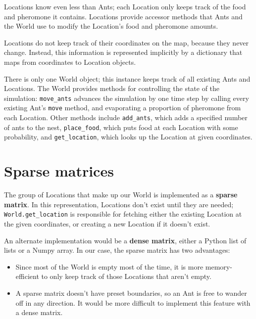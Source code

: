 \documentclass[10pt]{book}
\begin{document}
Locations know even less than Ants; each Location only keeps track of
the food and pheromone it contains. Locations provide
accessor methods that Ants and the World
use to modify the Location's food and pheromone amounts.

Locations do not keep track of their
coordinates on the map, because they never change.  Instead, this information
is represented implicitly by a dictionary that maps from coordinates
to Location objects.

There is only one World object; this instance keeps track of all
existing Ants and Locations.  The World provides methods for controlling
the state of the simulation: \texttt{move\_ants}
advances the simulation by one time step by calling every
existing Ant's \texttt{move} method, and evaporating a
proportion of pheromone from each Location. Other methods
include \texttt{add\_ants}, which adds a specified number of ants to
the nest, \texttt{place\_food}, which puts food at each Location with
some probability, and \texttt{get\_location}, which
looks up the Location at given coordinates.

\section{Sparse matrices}

The group of Locations that make up our World is implemented as a
\textbf{sparse matrix}. In this representation, Locations don't exist
until they are needed; \texttt{World.get\_location} is
responsible for fetching either the existing Location at the given
coordinates, or creating a new Location if it doesn't exist.

An alternate implementation would be a \textbf{dense matrix},
either a Python list of lists or a Numpy array.
In our case, the sparse matrix has two advantages:

\begin{itemize}

\item Since most of the World is empty most of the time, it is more
  memory-efficient to only keep track of those Locations that aren't
  empty.

\item A sparse matrix doesn't have preset boundaries, so an Ant is free to
  wander off in any direction. It would be more difficult to implement
  this feature with a dense matrix.

\end{itemize}
\end{document}
